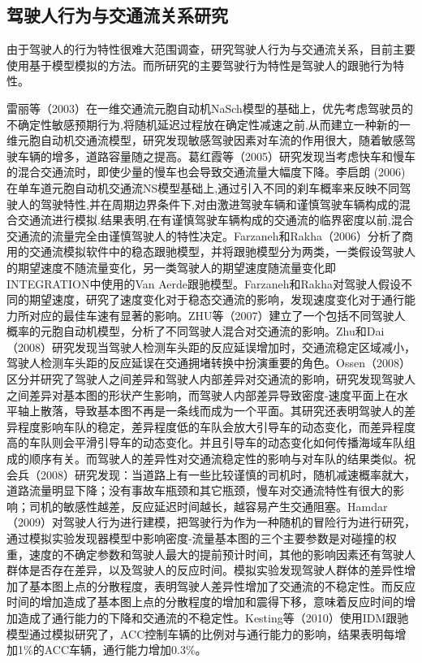 \subsection{驾驶人行为与交通流关系研究}
由于驾驶人的行为特性很难大范围调查，研究驾驶人行为与交通流关系，目前主要使用基于模型模拟的方法。而所研究的主要驾驶行为特性是驾驶人的跟驰行为特性。

雷丽等（2003）在一维交通流元胞自动机NaSch模型的基础上，优先考虑驾驶员的不确定性敏感预期行为,将随机延迟过程放在确定性减速之前,从而建立一种新的一维元胞自动机交通流模型，研究发现敏感驾驶因素对车流的作用很大，随着敏感驾驶车辆的增多，道路容量随之提高\cite{雷丽2003}。葛红霞等（2005）研究发现当考虑快车和慢车的混合交通流时，即使少量的慢车也会导致交通流量大幅度下降\cite{葛红霞2005}。李启朗 (2006) 在单车道元胞自动机交通流NS模型基础上,通过引入不同的刹车概率来反映不同驾驶人的驾驶特性,并在周期边界条件下,对由激进驾驶车辆和谨慎驾驶车辆构成的混合交通流进行模拟.结果表明,在有谨慎驾驶车辆构成的交通流的临界密度以前,混合交通流的流量完全由谨慎驾驶人的特性决定\cite{李启朗2006}。Farzaneh和Rakha（2006）分析了商用的交通流模拟软件中的稳态跟驰模型，并将跟驰模型分为两类，一类假设驾驶人的期望速度不随流量变化，另一类驾驶人的期望速度随流量变化即INTEGRATION中使用的Van Aerde跟驰模型。Farzaneh和Rakha对驾驶人假设不同的期望速度，研究了速度变化对于稳态交通流的影响，发现速度变化对于通行能力所对应的最佳车速有显著的影响\cite{Farzaneh2006}。ZHU等（2007）建立了一个包括不同驾驶人概率的元胞自动机模型，分析了不同驾驶人混合对交通流的影响\cite{H.B.ZHU2007}。Zhu和Dai（2008）研究发现当驾驶人检测车头距的反应延误增加时，交通流稳定区域减小，驾驶人检测车头距的反应延误在交通拥堵转换中扮演重要的角色\cite{Zhu2008}。Ossen（2008）区分并研究了驾驶人之间差异和驾驶人内部差异对交通流的影响，研究发现驾驶人之间差异对基本图的形状产生影响，而驾驶人内部差异导致密度-速度平面上在水平轴上散落，导致基本图不再是一条线而成为一个平面。其研究还表明驾驶人的差异程度影响车队的稳定，差异程度低的车队会放大引导车的动态变化，而差异程度高的车队则会平滑引导车的动态变化。并且引导车的动态变化如何传播海域车队组成的顺序有关。而驾驶人的差异性对交通流稳定性的影响与对车队的结果类似\cite{Ossen2008}。祝会兵（2008）研究发现：当道路上有一些比较谨慎的司机时，随机减速概率就大，道路流量明显下降；没有事故车瓶颈和其它瓶颈，慢车对交通流特性有很大的影响；司机的敏感性越差，反应延迟时间越长，越容易产生交通阻塞\cite{祝会兵2008}。Hamdar（2009）对驾驶人行为进行建模，把驾驶行为作为一种随机的冒险行为进行研究，通过模拟实验发现器模型中影响密度-流量基本图的三个主要参数是对碰撞的权重，速度的不确定参数和驾驶人最大的提前预计时间，其他的影响因素还有驾驶人群体是否存在差异，以及驾驶人的反应时间。模拟实验发现驾驶人群体的差异性增加了基本图上点的分散程度，表明驾驶人差异性增加了交通流的不稳定性。而反应时间的增加造成了基本图上点的分散程度的增加和震得下移，意味着反应时间的增加造成了通行能力的下降和交通流的不稳定性\cite{Hamdar2009a}。Kesting等（2010）使用IDM跟驰模型通过模拟研究了，ACC控制车辆的比例对与通行能力的影响，结果表明每增加1\%的ACC车辆，通行能力增加0.3\%\cite{Kesting2010}。

